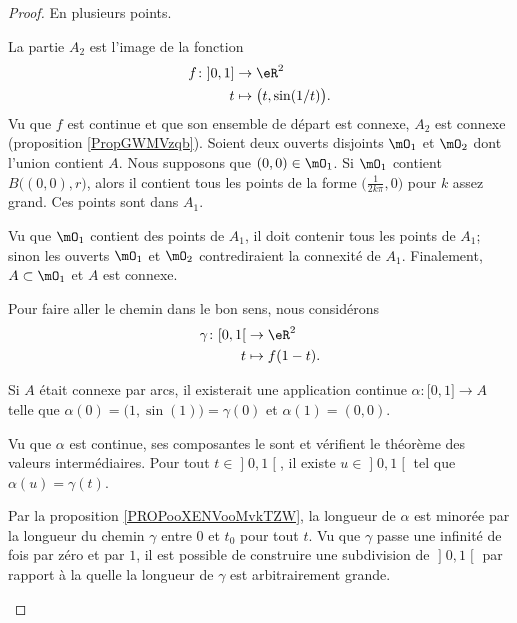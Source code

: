 \begin{proof}
	En plusieurs points.
	\begin{subproof}
		La partie \( A_2\) est l'image de la fonction
		\begin{equation}
			\begin{aligned}
				f\colon \mathopen] 0 , 1 \mathclose] & \to \eR^2                        \\
				t                                    & \mapsto \big( t,\sin(1/t) \big).
			\end{aligned}
		\end{equation}
		Vu que \( f\) est continue et que son ensemble de départ est connexe, \( A_2\) est connexe (proposition \ref{PropGWMVzqb}).
		Soient deux ouverts disjoints \( \mO_1\) et \( \mO_2\) dont l'union contient \( A\). Nous supposons que \( (0,0)\in \mO_1\). Si \( \mO_1\) contient \( B\big( (0,0),r \big)\), alors il contient tous les points de la forme \( \big( \frac{1}{ 2k\pi },0 \big)\) pour \( k\) assez grand. Ces points sont dans \( A_1\).

		Vu que \( \mO_1\) contient des points de \( A_1\), il doit contenir tous les points de \( A_1\); sinon les ouverts \( \mO_1\) et \( \mO_2\) contrediraient la connexité de \( A_1\). Finalement, \( A\subset \mO_1\) et \( A\) est connexe.

		Pour faire aller le chemin dans le bon sens, nous considérons
		\begin{equation}
			\begin{aligned}
				\gamma\colon \mathopen[ 0 , 1 \mathclose[ & \to \eR^2       \\
				t                                         & \mapsto f(1-t).
			\end{aligned}
		\end{equation}

		Si \( A\) était connexe par arcs, il existerait une application continue \( \alpha\colon \mathopen[ 0 , 1 \mathclose]\to A\) telle que \( \alpha(0)=\big( 1,\sin(1) \big)=\gamma(0)\) et \( \alpha(1)=(0,0)\).

		Vu que \( \alpha\) est continue, ses composantes le sont et vérifient le théorème des valeurs intermédiaires. Pour tout \( t\in \mathopen] 0 , 1 \mathclose[\), il existe \( u\in \mathopen] 0 , 1 \mathclose[\) tel que \( \alpha(u)=\gamma(t)\).

			Par la proposition \ref{PROPooXENVooMvkTZW}, la longueur de \( \alpha\) est minorée par la longueur du chemin \( \gamma\) entre \( 0\) et \( t_0\) pour tout \( t\).
			Vu que \( \gamma\) passe une infinité de fois par zéro et par \( 1\), il est possible de construire une subdivision de \( \mathopen] 0 , 1 \mathclose[\) par rapport à la quelle la longueur de \( \gamma\) est arbitrairement grande.


\end{subproof}
\end{proof}
